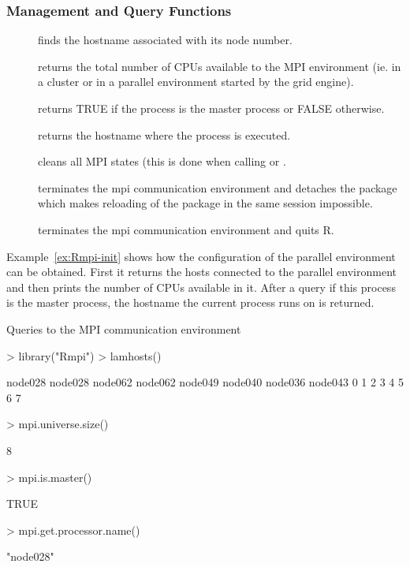 \subsubsection{Management and Query Functions}

\begin{description}
\item[] finds the hostname associated with its node
  number.
\item[] returns the total number of CPUs
  available to the MPI environment (ie. in a cluster or in a parallel
  environment started by the grid engine).
\item[] returns TRUE if the process is the
  master process or FALSE otherwise. 
\item[] returns the hostname where the
  process is executed.
\item[] cleans all MPI states (this is done when
  calling  or .
\item[] terminates the mpi communication
  environment and detaches the  package which makes reloading of
  the package  in the same session impossible.  
\item[] terminates the mpi communication
  environment and quits R.  
\end{description}

Example~\ref{ex:Rmpi-init} shows how the configuration of the
parallel environment can be obtained. First it returns the hosts
connected to the parallel environment and then prints the number of
CPUs available in it. After a query if this process is the master
process, the hostname the current process runs on is
returned. 

\begin{Example} Queries to the MPI communication environment
\label{ex:Rmpi-init}
\begin{Schunk}
\begin{Sinput}
> library("Rmpi")
> lamhosts()
\end{Sinput}
\begin{Soutput}
node028 node028 node062 node062 node049 node040 node036 node043 
      0       1       2       3       4       5       6       7 
\end{Soutput}
\begin{Sinput}
> mpi.universe.size()
\end{Sinput}
\begin{Soutput}
[1] 8
\end{Soutput}
\begin{Sinput}
> mpi.is.master()
\end{Sinput}
\begin{Soutput}
[1] TRUE
\end{Soutput}
\begin{Sinput}
> mpi.get.processor.name()
\end{Sinput}
\begin{Soutput}
[1] "node028"
\end{Soutput}
\end{Schunk}
\end{Example}

